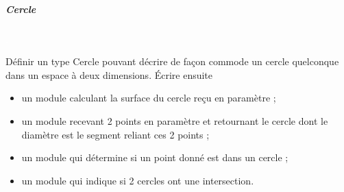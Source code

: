 \documentclass[11pt,a4paper]{article}
\begin{document}
            \par
        
			
		\subparagraph{Cercle} 
		
					\textcolor{white}{.} \par
				
          D\'efinir un type Cercle pouvant d\'ecrire de fa\c con commode un cercle quelconque dans un
          espace \`a deux dimensions. \'Ecrire ensuite
          
					\begin{itemize}
				
			\item un module calculant la surface du cercle re\c cu en param\`etre ;
			\item un module recevant 2 points en param\`etre et retournant le cercle dont le diam\`etre est le segment reliant ces 2 points ;
			\item un module qui d\'etermine si un point donn\'e est dans un cercle ;
			\item un module qui indique si 2 cercles ont une intersection.
					\end{itemize}
				
            \par
        
				
\end{document}
